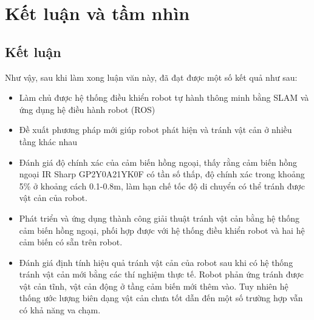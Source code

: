 
\chapter{Kết luận và tầm nhìn}
\label{chap:KetLuan}

\section{Kết luận}

Như vậy, sau khi làm xong luận văn này, đã đạt được một số kết quả như sau:
\begin{itemize}
    \item Làm chủ được hệ thống điều khiển robot tự hành thông minh bằng SLAM và ứng dụng hệ điều hành robot (ROS)
    \item Đề xuất phương pháp mới giúp robot phát hiện và tránh vật cản ở nhiều tầng khác nhau
    \item Đánh giá độ chính xác của cảm biến hồng ngoại, thấy rằng cảm biến hồng ngoại IR Sharp GP2Y0A21YK0F có tần số thấp, độ chính xác trong khoảng 5\% ở khoảng cách 0.1-0.8m, làm hạn chế tốc độ di chuyển có thể tránh được vật cản của robot.
    \item Phát triển và ứng dụng thành công giải thuật tránh vật cản bằng hệ thống cảm biến hồng ngoại, phối hợp được với hệ thống điều khiển robot và hai hệ cảm biến có sẵn trên robot.
    \item Đánh giá định tính hiệu quả tránh vật cản của robot sau khi có hệ thống tránh vật cản mới bằng các thí nghiệm thực tế. Robot phản ứng tránh được vật cản tĩnh, vật cản động ở tầng cảm biến mới thêm vào. Tuy nhiên hệ thống ước lượng biên dạng vật cản chưa tốt dẫn đến một số trường hợp vẫn có khả năng va chạm.
\end{itemize}


